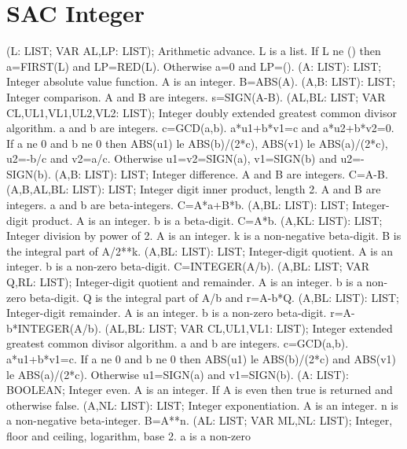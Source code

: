 \section{ SAC Integer  } 
 (L: LIST; VAR AL,LP: LIST); \eproc
\bcom Arithmetic advance. L is a list. If L ne () then a=FIRST(L) and
LP=RED(L). Otherwise a=0 and LP=(). \ecom 
{} (A: LIST): LIST; \eproc
\bcom Integer absolute value function. A is an integer. B=ABS(A). \ecom 
{} (A,B: LIST): LIST; \eproc
\bcom Integer comparison. A and B are integers. s=SIGN(A-B). \ecom 
{} (AL,BL: LIST; VAR CL,UL1,VL1,UL2,VL2: LIST); \eproc
\bcom Integer doubly extended greatest common divisor algorithm. a and b
are integers.  c=GCD(a,b).  a*u1+b*v1=c and a*u2+b*v2=0.
If a ne 0 and b ne 0 then ABS(u1) le ABS(b)/(2*c), ABS(v1) le
ABS(a)/(2*c), u2=-b/c and v2=a/c.  Otherwise u1=v2=SIGN(a),
v1=SIGN(b) and u2=-SIGN(b). \ecom 
{} (A,B: LIST): LIST; \eproc
\bcom Integer difference. A and B are integers. C=A-B. \ecom 
{} (A,B,AL,BL: LIST): LIST; \eproc
\bcom Integer digit inner product, length 2. A and B are integers.
a and b are beta-integers. C=A*a+B*b. \ecom 
{} (A,BL: LIST): LIST; \eproc
\bcom Integer-digit product. A is an integer. b is a beta-digit.
C=A*b. \ecom 
{} (A,KL: LIST): LIST; \eproc
\bcom Integer division by power of 2. A is an integer. k is a
non-negative beta-digit. B is the integral part of A/2**k. \ecom 
{} (A,BL: LIST): LIST; \eproc
\bcom Integer-digit quotient. A is an integer. b is a non-zero
beta-digit. C=INTEGER(A/b). \ecom 
{} (A,BL: LIST; VAR Q,RL: LIST); \eproc
\bcom Integer-digit quotient and remainder. A is an integer. b is a
non-zero beta-digit. Q is the integral part of A/b and r=A-b*Q. \ecom 
{} (A,BL: LIST): LIST; \eproc
\bcom Integer-digit remainder. A is an integer. b is a non-zero
beta-digit. r=A-b*INTEGER(A/b). \ecom 
{} (AL,BL: LIST; VAR CL,UL1,VL1: LIST); \eproc
\bcom Integer extended greatest common divisor algorithm. a and b are
integers.  c=GCD(a,b).  a*u1+b*v1=c.  If a ne 0 and b ne 0
then ABS(u1) le ABS(b)/(2*c) and ABS(v1) le ABS(a)/(2*c).
Otherwise u1=SIGN(a) and v1=SIGN(b). \ecom 
{} (A: LIST): BOOLEAN; \eproc
\bcom Integer even. A is an integer. If A is even then true is returned
and otherwise false.  \ecom 
{} (A,NL: LIST): LIST; \eproc
\bcom Integer exponentiation. A is an integer. n is a non-negative
beta-integer. B=A**n. \ecom 
{} (AL: LIST; VAR ML,NL: LIST); \eproc
\bcom Integer, floor and ceiling, logarithm, base 2. a is a non-zero
